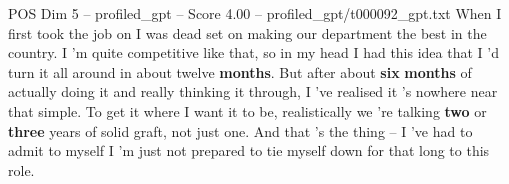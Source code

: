 \begin{textsample}{POS Dim 5 – profiled\_gpt – Score 4.00 – profiled\_gpt/t000092\_gpt.txt}  \label{ex:f5_pos_029}
When I first took the job on I was dead set on making our department the best in the country.
I ’m quite competitive like that, so in my head I had this idea that I ’d turn it all around in about twelve \textbf{months}.
But after about \textbf{six} \textbf{months} of actually doing it and really thinking it through, I ’ve realised it ’s nowhere near that simple.
To get it where I want it to be, realistically we ’re talking \textbf{two} or \textbf{three} years of solid graft, not just one.
And that ’s the thing – I ’ve had to admit to myself I ’m just not prepared to tie myself down for that long to this role.

\end{textsample}
